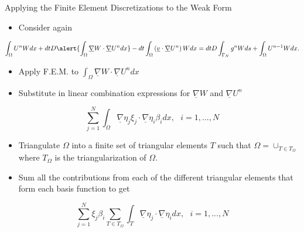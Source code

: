 \documentclass[10pt]{beamer}
\begin{document}
\begin{frame}{Applying the Finite Element Discretizations to the Weak Form} \label{applyingFEMtoweakform}
\begin{itemize}
\item Consider again
\end{itemize}
\footnotesize
\begin{equation}
\int_{\Omega}U^{n}W dx +dtD\alert{\int_{\Omega}\underline{\nabla}W \cdot \underline{\nabla} U^{n} dx}-dt\int_{\Omega}\left(\underline{v}\cdot \underline{\nabla}U^{n}\right)W dx=dtD\int_{\Gamma_{N}}g^{n}W ds+ \int_{\Omega} U^{n-1}W dx.
\end{equation}
\normalsize
\begin{itemize}
\item Apply F.E.M. to $\int_{\Omega}\underline{\nabla}W \cdot \underline{\nabla} U^{n} dx$
\end{itemize}

\begin{itemize}
\item Substitute in linear combination expressions for $\underline{\nabla}W$ and $\underline{\nabla}U^{n}$
\end{itemize}

\begin{equation}
\sum_{j=1}^{N} \int_{\Omega} \underline{\nabla}\eta_{j} \xi_{j} \cdot \underline{\nabla}\eta_{i} \beta_{i} dx, \texttt{ } i=1,...,N
\end{equation}

\begin{itemize}
\item Triangulate $\Omega$ into a finite set of triangular elements $T$ such that $\Omega = \cup_{T \in T_{\Omega}}$ where $T_{\Omega}$ is the triangularization of $\Omega$.
\end{itemize}

\begin{itemize}
\item Sum all the contributions from each of the different triangular elements that form each basis function to get
\end{itemize}

\begin{equation}
\sum_{j=1}^{N} \xi_{j}\beta_{i}\sum_{T \in T_{\Omega}}\int_{T} \underline{\nabla} \eta_{j} \cdot \underline{\nabla}\eta_{i} dx, \texttt{ } i=1,...,N
\end{equation}
\hyperlink{Questions}{}
\end{frame}
\end{document}
